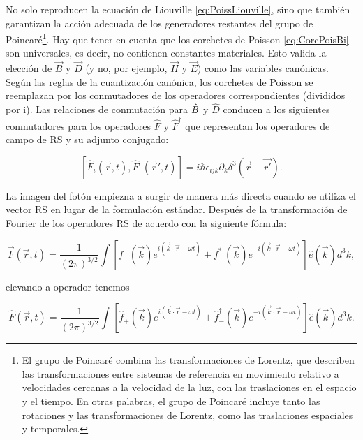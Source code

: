             No solo reproducen la ecuación de Liouville \ref{eq:PoissLiouville}, sino que también garantizan la acción adecuada de los generadores restantes del grupo de Poincaré\footnote{El grupo de Poincaré combina las transformaciones de Lorentz, que describen las transformaciones entre sistemas de referencia en movimiento relativo a velocidades cercanas a la velocidad de la luz, con las traslaciones en el espacio y el tiempo. En otras palabras, el grupo de Poincaré incluye tanto las rotaciones y las transformaciones de Lorentz, como las traslaciones espaciales y temporales.}. Hay que tener en cuenta que los corchetes de Poisson \ref{eq:CorcPoisBi} son universales, es decir, no contienen constantes materiales. Esto valida la elección de $\Vec{B}$ y $\Vec{D}$ (y no, por ejemplo, $\Vec{H}$ y $\Vec{E}$) como las variables canónicas. Según las reglas de la cuantización canónica, los corchetes de Poisson se reemplazan por los conmutadores de los operadores correspondientes (divididos por i). Las relaciones de conmutación para $\Hat{B}$ y $\hat{D}$ conducen a los siguientes conmutadores para los operadores $\hat{F}$ y $\hat{F}^{\dagger}$ que representan los operadores de campo de RS y su adjunto conjugado:

            \begin{equation}\label{eq:ConmutacionDeF}
                \left[ \hat{F}_i(\Vec{r},t) , \hat{F}^{\dagger}(\Vec{r}',t) \right] = i\hbar\epsilon_{ijk}\partial_k\delta^3(\Vec{r}-\Vec{r'}).
            \end{equation}

            La imagen del fotón empiezna a surgir de manera más directa cuando se utiliza el vector RS en lugar de la formulación estándar. Después de la transformación de Fourier de los operadores RS de acuerdo con la siguiente fórmula:

            \begin{equation}
                \Vec{F}(\Vec{r},t) =  \frac{1}{(2\pi)^{3/2}}\int \left[f_+(\Vec{k})e^{i(\Vec{k}\cdot \Vec{r} - \omega t)} + f_-^*(\Vec{k})e^{-i(\Vec{k}\cdot \Vec{r} - \omega t)}\right]\hat{e}(\Vec{k})d^3k,
            \end{equation}

            elevando a operador tenemos

            \begin{equation}
                \hat{F}(\Vec{r},t) =  \frac{1}{(2\pi)^{3/2}}\int \left[\hat{f}_+(\Vec{k})e^{i(\Vec{k}\cdot \Vec{r} - \omega t)} + \hat{f}_-^{\dagger}(\Vec{k})e^{-i(\Vec{k}\cdot \Vec{r} - \omega t)}\right]\hat{e}(\Vec{k})d^3k.
            \end{equation}


